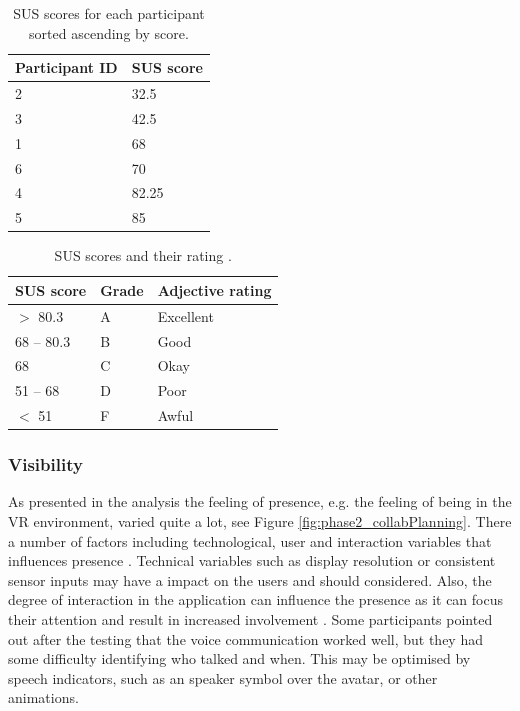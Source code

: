 \begin{table}[H]
\centering
\begin{tabular}{l|l}
{ \textbf{Participant ID}} & { \textbf{SUS score}} \\ \hline
2   & 32.5                                     \\ 
3   & 42.5                                    \\ 
1   & 68                                   \\ 
6   & 70                                     \\ 
4   & 82.25                                    \\ 
5   & 85                                     \\ 
\end{tabular}
\caption{SUS scores for each participant sorted ascending by score.}
\label{table:SUSscores}
\end{table}


\begin{table}[H]
\centering
\begin{tabular}{l|l|l}
{ \textbf{SUS score}} & { \textbf{Grade}} & { \textbf{Adjective rating}} \\ \hline
$>$ 80.3   & A &  Excellent                                 \\ 
68 – 80.3   & B & Good                                  \\ 
68   & C   &   Okay                              \\ 
51 – 68   & D   &  Poor                               \\ 
$<$ 51  & F      &     Awful                         \\ 
\end{tabular}
\caption{SUS scores and their rating \cite{SusMeasuringInterpret}.}
\label{table:SUSinterpret}
\end{table}



\subsubsection{Visibility}
As presented in the analysis the feeling of presence, e.g. the feeling of being in the VR environment, varied quite a lot, see Figure \ref{fig:phase2_collabPlanning}. There a number of factors including technological, user and interaction variables that influences presence \cite{oh2018systematic} \cite{presenceInVirtualReality:}. Technical variables such as display resolution or consistent sensor inputs may have a impact on the users and should considered. Also, the degree of interaction in the application can influence the presence as it can focus their attention and result in increased involvement \cite{presenceInVirtualReality:}. 
Some participants pointed out after the testing that the voice communication worked well, but they had some difficulty identifying who talked and when. This may be optimised by speech indicators, such as an speaker symbol over the avatar, or other animations.     

